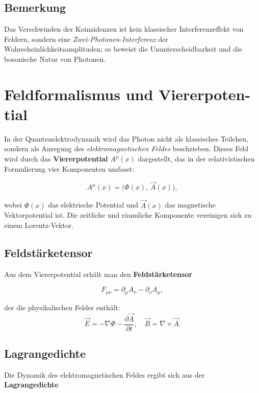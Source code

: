 \subsection*{Bemerkung}
Das Verschwinden der Koinzidenzen ist kein klassischer Interferenzeffekt von Feldern, sondern eine \emph{Zwei-Photonen-Interferenz} der Wahrscheinlichkeitsamplituden; es beweist die Ununterscheidbarkeit und die bosonische Natur von
 Photonen.
 
 
\section{Feldformalismus und Viererpoten- \newline tial}
\label{anhangA:feldformalismus}
\label{anhangA:viererpotential} %

In der Quantenelektrodynamik wird das Photon nicht als klassisches Teilchen,
sondern als Anregung des \emph{elektromagnetischen Feldes} beschrieben. 
Dieses Feld wird durch das \textbf{Viererpotential} \( A^\mu(x) \) dargestellt,
das in der relativistischen Formulierung vier Komponenten umfasst:

\[
A^\mu(x) = \big( \Phi(x), \, \vec{A}(x) \big) ,
\]

wobei \( \Phi(x) \) das elektrische Potential und \( \vec{A}(x) \) das magnetische Vektorpotential ist. 
Die zeitliche und räumliche Komponente vereinigen sich zu einem Lorentz-Vektor.

\subsection*{Feldstärketensor}
Aus dem Viererpotential erhält man den \textbf{Feldstärketensor}

\[
F_{\mu\nu} = \partial_\mu A_\nu - \partial_\nu A_\mu ,
\]

der die physikalischen Felder enthält:
\[
\vec{E} = -\nabla \Phi - \frac{\partial \vec{A}}{\partial t}, 
\quad
\vec{B} = \nabla \times \vec{A}.
\]

\subsection*{Lagrangedichte}
Die Dynamik des elektromagnetischen Feldes ergibt sich aus der
\textbf{Lagrangedichte}

